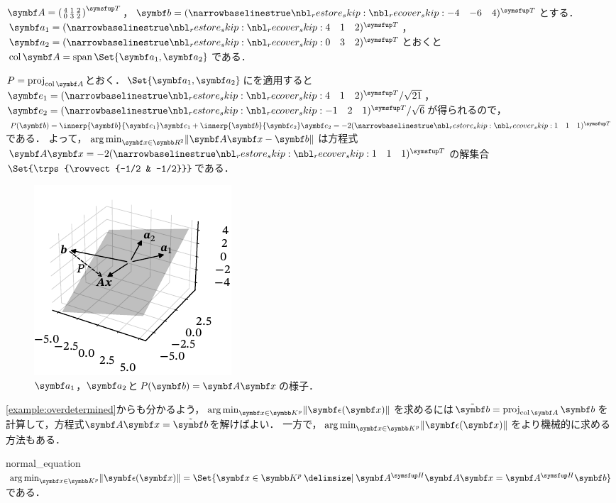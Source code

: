 \documentclass[../../main]{subfiles}
\begin{document}
\begin{example}\label{example:overdetermined}
  \(\mat{A}=\trps{\smallmatrice{4 & 1 & 2 \\ 0 & 3 & 2}}\)，\(\vect{b}=\trps{\rowvect{-4 & -6 & 4}}\)とする．
  \(\vect{a}_1=\trps{\rowvect{4 & 1 & 2}}\)，\(\vect{a}_2=\trps{\rowvect{0 & 3 & 2}}\)とおくと\(\colsp\mat{A}=\spannedby\Set{\vect{a}_1,\vect{a}_2}\)である．

  \(P=\proj_{\colsp\mat{A}}\)とおく．\(\Set{\vect{a}_1,\vect{a}_2}\)にを適用すると
  \(\vect{e}_1=\trps{\rowvect{4 & 1 & 2}}/\sqrt{21}\)，\(\vect{e}_2=\trps{\rowvect{-1 & 2 & 1}}/\sqrt{6}\)が得られるので，
  \(P(\vect{b})=\innerp{\vect{b}}{\vect{e}_1}\vect{e}_1+\innerp{\vect{b}}{\vect{e}_2}\vect{e}_2=-2\trps{\rowvect{1 & 1 & 1}}\)である．
  よって，\(\argmin_{\vect{x}\in\numset{R}^2}\vnorm{\mat{A}\vect{x}-\vect{b}}\)は方程式\(\mat{A}\vect{x}=-2\trps{\rowvect{1 & 1 & 1}}\)の解集合\(\Set{\trps{\rowvect{-1/2 & -1/2}}}\)である．
\end{example}

\begin{figure}[htbp]
  \centering
  \includegraphics{figures/overdetermined.pdf}
  \caption{\(\vect{a}_1\)，\(\vect{a}_2\)と\(P(\vect{b})=\mat{A}\vect{x}\)の様子．}
\end{figure}

\cref{example:overdetermined}からも分かるよう，\(\argmin_{\vect{x}\in\numset{K}^p}\vnorm{\vect{\epsilon}(\vect{x})}\)を求めるには\(\tilde{\vect{b}}=\proj_{\colsp\mat{A}}\vect{b}\)を計算して，方程式\(\mat{A}\vect{x}=\tilde{\vect{b}}\)を解けばよい．
一方で，\(\argmin_{\vect{x}\in\numset{K}^p}\vnorm{\vect{\epsilon}(\vect{x})}\)をより機械的に求める方法もある．

\begin{proposition}{}{normal_equation}
  \(\argmin_{\vect{x}\in\numset{K}^p}\vnorm{\vect{\epsilon}(\vect{x})}=\Set{\vect{x}\in\numset{K}^p\given\htrps{\mat{A}}\mat{A}\vect{x}=\htrps{\mat{A}}\vect{b}}\)である．
\end{proposition}
\end{document}
